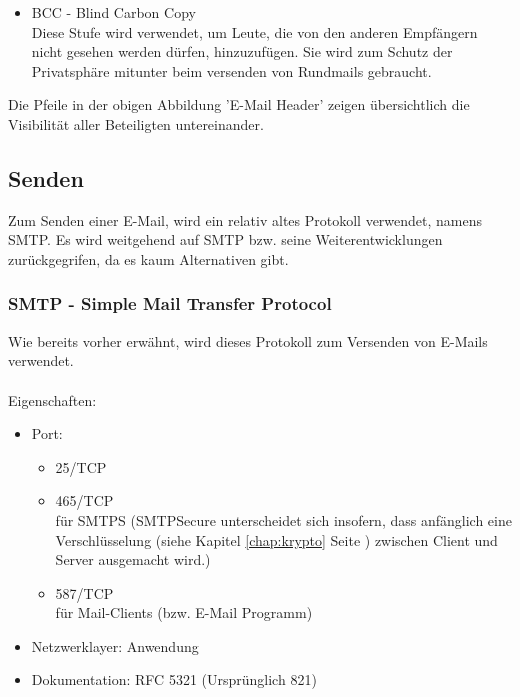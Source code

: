 \documentclass[12pt,a4paper]{report}
\begin{document}
\begin{onehalfspace}
\begin{itemize}
\item BCC - Blind Carbon Copy\\
Diese Stufe wird verwendet, um Leute, die von den anderen Empfängern nicht gesehen werden dürfen, hinzuzufügen. Sie wird zum Schutz der Privatsphäre mitunter beim versenden von Rundmails gebraucht. 
\end{itemize}  
Die Pfeile in der obigen Abbildung 'E-Mail Header' zeigen übersichtlich die Visibilität aller Beteiligten untereinander.
\subsection{Senden}
Zum Senden einer E-Mail, wird ein relativ altes Protokoll verwendet, namens SMTP. Es wird weitgehend auf SMTP bzw. seine Weiterentwicklungen zurückgegrifen, da es kaum Alternativen gibt.
\subsubsection{SMTP - Simple Mail Transfer Protocol}
Wie bereits vorher erwähnt, wird dieses Protokoll zum Versenden von E-Mails verwendet.\\\\ 
Eigenschaften:\\
\begin{itemize}
\item Port:
\begin{itemize}
\item 25/TCP
\item 465/TCP\\
für SMTPS (SMTPSecure unterscheidet sich insofern, dass anfänglich eine Verschlüsselung (siehe Kapitel \ref{chap:krypto} Seite \pageref{chap:krypto}) zwischen Client und Server ausgemacht wird.)
\item 587/TCP\\
für Mail-Clients (bzw. E-Mail Programm)
\end{itemize}
\item Netzwerklayer: Anwendung
\item Dokumentation: RFC 5321 (Ursprünglich 821)
\end{itemize}

\end{onehalfspace}
\end{document}
